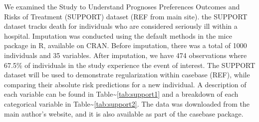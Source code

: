 \documentclass[
]{jss}
\begin{document}
We examined the Study to Understand Prognoses Preferences Outcomes and
Risks of Treatment (SUPPORT) dataset (REF from main site). the SUPPORT
dataset tracks death for individuals who are considered seriously ill
within a hospital. Imputation was conducted using the default methods in
the mice package in R, available on CRAN. Before imputation, there was a
total of 1000 individuals and 35 variables. After imputation, we have
474 observations where 67.5\% of individuals in the study experience the
event of interest. The SUPPORT dataset will be used to demonstrate
regularization within casebase (REF), while comparing their absolute
risk predictions for a new individual. A description of each variable
can be found in Table\textasciitilde{}\ref{tab:support1} and a breakdown
of each categorical variable in
Table\textasciitilde{}\ref{tab:support2}. The data was downloaded from
the main author's website, and it is also available as part of the
casebase package.
\end{document}
